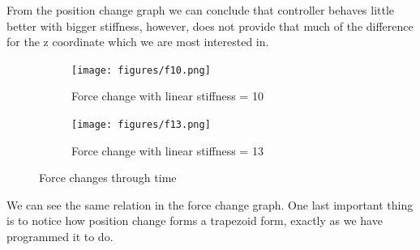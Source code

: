 From the position change graph we can conclude that controller behaves little better with bigger stiffness, however, does not provide that much of the difference for the z coordinate which we are most interested in.


\begin{figure}[htbp]
    \centering
    \begin{subfigure}{0.46\textwidth}
        \centering
        \texttt{[image: figures/f10.png]}
        \caption{Force change with linear stiffness = 10 }
        \label{fig:franka-f-10-bag}
    \end{subfigure}
    \hfill
    \begin{subfigure}{0.46\textwidth}
        \centering
        \texttt{[image: figures/f13.png]}
        \caption{Force change with linear stiffness = 13}
        \label{fig:franka-f-13-bag}
    \end{subfigure}

    \caption{Force changes through time}
    \label{fig:franka-pos-bag}
\end{figure}

We can see the same relation in the force change graph. One last important thing is to notice how position change forms a trapezoid form, exactly as we have programmed it to do.


 